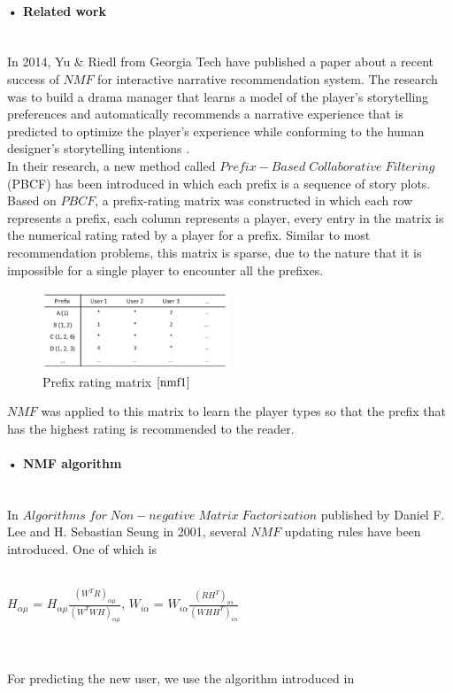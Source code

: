 \documentclass[11pt]{article} %
\begin{document}
\paragraph{• Related work}\mbox{}\\
In 2014, Yu $\&$ Riedl from Georgia Tech have published a paper\cite{nmf1} about a recent success of $NMF$ for interactive narrative recommendation system. The research was to build a drama manager that learns a model of the player’s storytelling preferences and automatically recommends a narrative experience that is predicted to optimize the player’s experience while conforming to the human designer’s storytelling intentions \cite[p.~1]{nmf1}.\\
In their research, a new method called $Prefix-Based\;Collaborative\;Filtering$ (PBCF) \cite[p.~2]{nmf1} has been introduced in which each prefix is a sequence of story plots. Based on $PBCF$, a prefix-rating matrix was constructed in which each row represents a prefix, each column represents a player, every entry in the matrix is the numerical rating rated by a player for a prefix. Similar to most recommendation problems, this matrix is sparse, due to the nature that it is impossible for a single player to encounter all the prefixes.
\begin{figure}[H]
\caption{Prefix rating matrix $\cite[p.~4]{nmf1}$}
\centering
\includegraphics[width=0.5\textwidth]{prefixrating}
\end{figure}
$NMF$ was applied to this matrix to learn the player types so that the prefix that has the highest rating is recommended to the reader.
\paragraph{• NMF algorithm}\mbox{}\\
In $Algorithms\;for\;Non-negative\;Matrix\; Factorization$ published by Daniel F. Lee and H. Sebastian Seung in 2001, several $NMF$ updating rules have been introduced. One of which is\\\\
\centerline{$H_{\alpha\mu}$ = $H_{\alpha\mu}\frac{(W^{T}R)_{\alpha\mu}}{(W^{T}WH)_{\alpha\mu}}$, $W_{i\alpha}$ = $W_{i\alpha}\frac{(RH^{T})_{i\alpha}}{(WHH^{T})_{i\alpha}}$ \cite[p.~3]{nmfalg}}\\\\
For predicting the new user, we use the algorithm introduced in 
\end{document}
